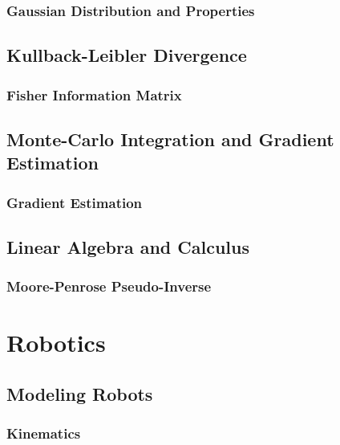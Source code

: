 		\subsection{Gaussian Distribution and Properties} %

	\section{Kullback-Leibler Divergence} %

		\subsection{Fisher Information Matrix} %

	\section{Monte-Carlo Integration and Gradient Estimation} %

		\subsection{Gradient Estimation} %

	\section{Linear Algebra and Calculus} %

		\subsection{Moore-Penrose Pseudo-Inverse} %

\chapter{Robotics} %

	\section{Modeling Robots} %

		\subsection{Kinematics} %


